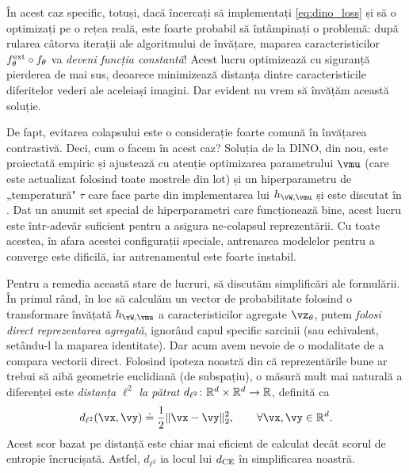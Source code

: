 \documentclass[../../book-main_ro.tex]{subfiles}
\begin{document}
În acest caz specific, totuși, dacă încercați să implementați \eqref{eq:dino_loss} și să o optimizați pe o rețea reală, este foarte probabil să întâmpinați o problemă: după rularea câtorva iterații ale algoritmului de învățare, maparea caracteristicilor \(f_{\theta}^{\mathrm{ext}} \circ f_{\theta}\) va \textit{deveni funcția constantă}! Acest lucru optimizează cu siguranță pierderea de mai sus, deoarece minimizează distanța dintre caracteristicile diferitelor vederi ale aceleiași imagini. Dar evident nu vrem să învățăm această soluție.

De fapt, evitarea colapsului este o considerație foarte comună în învățarea contrastivă. Deci, cum o facem în acest caz? Soluția de la DINO, din nou, este proiectată empiric și ajustează cu atenție optimizarea parametrului \(\vmu\) (care este actualizat folosind toate mostrele din lot) și un hiperparametru de „temperatură" \(\tau\) care face parte din implementarea lui \(h_{\vW, \vmu}\) și este discutat în . Dat un anumit set special de hiperparametri care funcționează bine, acest lucru este într-adevăr suficient pentru a asigura ne-colapsul reprezentării. Cu toate acestea, în afara acestei configurații speciale, antrenarea modelelor pentru a converge este dificilă, iar antrenamentul este foarte instabil.

Pentru a remedia această stare de lucruri, să discutăm simplificări ale formulării. În primul rând, în loc să calculăm un vector de probabilitate folosind o transformare învățată \(h_{\vW, \vmu}\) a caracteristicilor agregate \(\vz_{\theta}\), putem \textit{folosi direct reprezentarea agregată}, ignorând capul specific sarcinii (sau echivalent, setându-l la maparea identitate). Dar acum avem nevoie de o modalitate de a compara vectorii direct. Folosind ipoteza noastră din  că reprezentările bune ar trebui să aibă geometrie euclidiană (de subspațiu), o măsură mult mai naturală a diferenței este \textit{distanța \(\ell^{2}\) la pătrat} \(d_{\ell^{2}} \colon \mathbb{R}^{d} \times \mathbb{R}^{d} \to \mathbb{R}\), definită ca 
\begin{equation}\label{eq:cosine_similarity}
    d_{\ell^{2}}(\vx, \vy) \doteq \frac{1}{2}\norm{\vx - \vy}_{2}^{2}, \qquad  \forall \vx, \vy \in \R^{d}.
\end{equation}
Acest scor bazat pe distanță este chiar mai eficient de calculat decât scorul de entropie încrucișată. Astfel, \(d_{\ell^{2}}\) ia locul lui \(d_{\operatorname{CE}}\) în simplificarea noastră.
\end{document}
